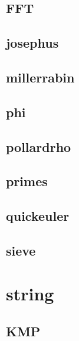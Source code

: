 \documentclass[a4paper,10pt,twocolumn,oneside]{article}
\begin{document}
    \subsection{FFT}
    

    \subsection{josephus}
    

    \vspace{1.2em}
    \vspace{1.2em}
    \subsection{millerrabin}
    

    \subsection{phi}
    

    \subsection{pollardrho}
    

    \subsection{primes}
    

    \subsection{quickeuler}
    

    \subsection{sieve}
    

\section{string}
    \subsection{KMP}
    
\end{document}
